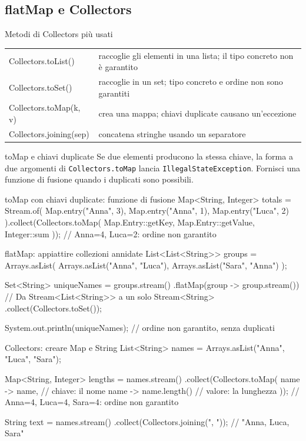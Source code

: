﻿\documentclass[10pt,a4paper]{article}
\newcommand{\cmd}[1]{\texttt{#1}}
\newcommand{\topicsubsection}[1]{\Needspace{10\baselineskip}\subsection{#1}}
\newenvironment{topicblock}{%
  \par\medskip\noindent\begin{minipage}{\textwidth}%
}{%
  \end{minipage}\par\medskip%
}
\begin{document}
\begin{topicblock}
\topicsubsection{flatMap e Collectors}

\begin{concept}{Metodi di Collectors più usati}
\begin{tabularx}{\textwidth}{>{\ttfamily\small}p{4.4cm} X}
Collectors.toList() & raccoglie gli elementi in una lista; il tipo concreto non è garantito \\
Collectors.toSet() & raccoglie in un set; tipo concreto e ordine non sono garantiti \\
Collectors.toMap(k, v) & crea una mappa; chiavi duplicate causano un'eccezione \\
Collectors.joining(sep) & concatena stringhe usando un separatore \\
\end{tabularx}
\end{concept}

\begin{examtrap}{toMap e chiavi duplicate}
Se due elementi producono la stessa chiave, la forma a due argomenti di
\cmd{Collectors.toMap} lancia \cmd{IllegalStateException}. Fornisci una
funzione di fusione quando i duplicati sono possibili.
\end{examtrap}

\begin{codebox}{toMap con chiavi duplicate: funzione di fusione}
Map<String, Integer> totals = Stream.of(
    Map.entry("Anna", 3),
    Map.entry("Anna", 1),
    Map.entry("Luca", 2)
).collect(Collectors.toMap(
    Map.Entry::getKey,
    Map.Entry::getValue,
    Integer::sum
));
// {Anna=4, Luca=2}: ordine non garantito
\end{codebox}

\begin{codebox}{flatMap: appiattire collezioni annidate}
List<List<String>> groups = Arrays.asList(
    Arrays.asList("Anna", "Luca"),
    Arrays.asList("Sara", "Anna")
);

Set<String> uniqueNames = groups.stream()
    .flatMap(group -> group.stream())
    // Da Stream<List<String>> a un solo Stream<String>
    .collect(Collectors.toSet());

System.out.println(uniqueNames); // ordine non garantito, senza duplicati
\end{codebox}

\begin{codebox}{Collectors: creare Map e String}
List<String> names = Arrays.asList("Anna", "Luca", "Sara");

Map<String, Integer> lengths = names.stream()
    .collect(Collectors.toMap(
        name -> name,          // chiave: il nome
        name -> name.length()  // valore: la lunghezza
    ));
// {Anna=4, Luca=4, Sara=4}: ordine non garantito

String text = names.stream()
    .collect(Collectors.joining(", "));
// "Anna, Luca, Sara"
\end{codebox}

\end{topicblock}
\end{document}
